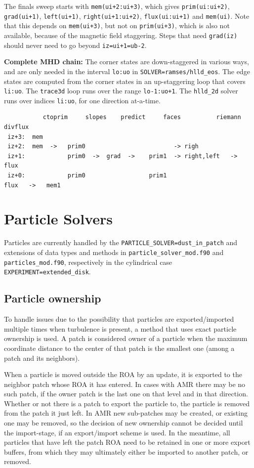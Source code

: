 \documentclass[paper=a4,fontsize=11pt]{scrartcl}
\numberwithin{equation}{section}		%
\numberwithin{figure}{section}			%
\numberwithin{table}{section}				%
\begin{document}
The finals sweep starts with \verb|mem(ui+2:ui+3)|, which gives \verb|prim(ui:ui+2)|, \verb|grad(ui+1)|, \verb|left(ui+1)|, \verb|right(ui+1:ui+2)|, \verb|flux(ui:ui+1)| and \verb|mem(ui)|.  Note that this depends on \verb|mem(ui+3)|, but not on \verb|prim(ui+3)|, which is also not available, because of the magnetic field staggering.  Steps that need \verb|grad(iz)| should never need to go beyond \verb|iz=ui+1=ub-2|.

\textbf{Complete MHD chain:} The corner states are down-staggered in various ways, and are only needed in the interval \verb|lo:uo| in \verb|SOLVER=ramses/hlld_eos|.  The edge states are computed from the corner states in an up-staggering loop that covers \verb|li:uo|.  The \verb|trace3d| loop runs over the range \verb|lo-1:uo+1|.  The \verb|hlld_2d| solver runs over indices \verb|li:uo|, for one direction at-a-time.
\begin{verbatim}
           ctoprim     slopes    predict     faces          riemann   divflux
 iz+3:  mem
 iz+2:  mem  ->   prim0                         -> righ
 iz+1:            prim0  ->  grad  ->    prim1  -> right,left   ->  flux 
 iz+0:            prim0                  prim1                      flux   ->   mem1
\end{verbatim}
\section{Particle Solvers}
Particles are currently handled by the \verb'PARTICLE_SOLVER=dust_in_patch' and  extensions of data types and methods in \verb'particle_solver_mod.f90' and \verb'particles_mod.f90', respectively in the cylindrical case \verb'EXPERIMENT=extended_disk'. 

\subsection{Particle ownership}
To handle issues due to the possibility that particles are exported/imported multiple times when turbulence is present, a method that uses exact particle ownership is used.  A patch is considered owner of a particle when the maximum coordinate distance to the center of that patch is the smallest one (among a patch and its neighbors).  

When a particle is moved outside the ROA by an update, it is exported to the neighbor patch whose ROA it has entered.  In cases with AMR there may be no such patch, if the owner patch is the last one on that level and in that direction.  Whether or not there is a patch to export the particle to, the particle is removed from the patch it just left.   In AMR new sub-patches may be created, or existing one may be removed, so the decision of new ownership cannot be decided until the import-stage, if an export/import scheme is used.  In the meantime, all particles that have left the patch ROA need to be retained in one or more export buffers, from which they may ultimately either be imported to another patch, or removed.
\end{document}

